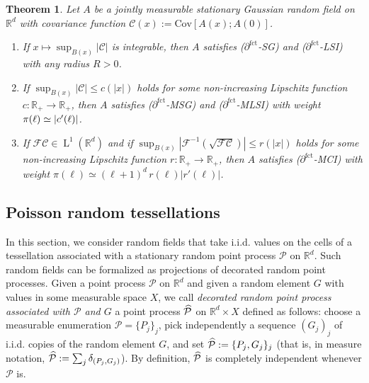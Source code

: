 \documentclass[11pt]{article}
\newtheorem{theo}{Theorem}[section]
\theoremstyle{definition}
\numberwithin{equation}{section}
\numberwithin{figure}{section}
\numberwithin{table}{section}
\newcommand{\R}{\mathbb R}
\newcommand{\Cc}{\mathcal C}
\newcommand{\Pc}{\mathcal P}
\newcommand{\F}{\mathcal F}
\DeclareMathOperator{\Ld}{L}
\newcommand{\parfct}[1]{\partial_{#1}^{\operatorname{fct}}}
\newcommand{\cov}[2]{\mathrm{Cov}\left[#1;#2\right]}
\newcommand*{\romanenumi}{\renewcommand*{\theenumi}{\roman{enumi}}}
\renewcommand*{\hat}[1]{\mathchoice{\widehat{#1}}{\widehat{#1}}{\oldhat{#1}}{\oldhat{#1}}}\let\oldexists\exists
\renewcommand*{\exists}{\mathrel{\oldexists}}
\begin{document}
\begin{theo}\label{cor:gaussiansg}
Let $A$ be a jointly measurable stationary Gaussian random field on $\R^d$ with covariance function $\Cc(x):=\cov{A(x)}{A(0)}$.
\begin{enumerate}\romanenumi
\item \label{theo3.1.1}If $x\mapsto \sup_{B(x)}|\Cc|$ is integrable, then $A$ satisfies \emph{($\parfct{}$-SG)} and \emph{($\parfct{}$-LSI)} with any radius $R>0$.
\item \label{theo3.1.2}If $\sup_{B(x)}|\Cc| \le c(|x|)$ holds for some non-increasing Lipschitz function\linebreak$c:\R_+\to\R_+$, then $A$ satisfies \emph{($\parfct{}$-MSG)} and \emph{($\parfct{}$-MLSI)} with weight $\pi(\ell)\linebreak\simeq |c'(\ell)|$.
\item \label{theo3.1.3}If $\F\Cc\in\Ld^1(\R^d)$ and if $\sup_{B(x)}|\F^{-1}(\sqrt{\F\Cc})|\le r(|x|)$ holds for some non-increasing Lipschitz function $r:\R_+\to\R_+$, then $A$ satisfies \emph{($\parfct{}$-MCI)} with weight $\pi(\ell)\simeq (\ell+1)^d\,r(\ell)|r'(\ell)|$.
\qedhere
\end{enumerate}
\end{theo}

\subsection{Poisson random tessellations}\label{chap:tessel}
In this section, we consider random fields that take i.i.d. values on the cells of a tessellation associated with a stationary random point process $\Pc$ on $\R^d$. Such random fields can be formalized as projections of decorated random point processes. Given a point process $\Pc$ on $\R^d$ and given a random element $G$ with values in some measurable space $X$, we call \emph{decorated random point process associated with $\Pc$ and $G$} a point process $\hat\Pc$ on $\R^d\times X$ defined as follows: choose a measurable enumeration $\Pc=\{P_j\}_j$, pick independently a sequence $(G_j)_j$ of i.i.d. copies of the random element $G$, and set $\hat\Pc:=\{P_j,G_j\}_j$ (that is, in measure notation, $\hat\Pc:=\sum_j\delta_{(P_j,G_j)}$). By definition, $\hat\Pc$ is completely independent whenever $\Pc$ is.

\end{document}
